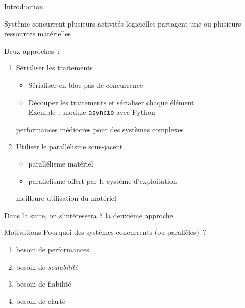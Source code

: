 \begin {frame} {Introduction}

    Système concurrent \implique plusieurs activités logicielles
    partagent une ou plusieurs ressources matérielles

    \vspace* {3mm}

    Deux approches~:

    \begin {enumerate}
	\item Sérialiser les traitements
	    \begin {itemize}
		\item Sérialiser en bloc \implique pas de
		    concurrence
		\item Découper les traitements et sérialiser chaque élément \\
		    Exemple~: module \texttt {asyncio} avec Python

	    \end {itemize}
	    \implique performances médiocres pour des systèmes complexes

	\item Utiliser le parallélisme sous-jacent
	    \begin {itemize}
		\item parallélisme matériel
		\item parallélisme offert par le système d'exploitation
	    \end {itemize}
	    \implique meilleure utilisation du matériel
    \end {enumerate}

    Dans la suite, on s'intéressera à la deuxième approche

\end {frame}



\begin {frame} {Motivations}
    Pourquoi des systèmes concurrents (ou parallèles)~?

    \begin {enumerate}
	\item besoin de performances
	\item besoin de \emph {scalabilité}
	\item besoin de fiabilité
	\item besoin de clarté
    \end {enumerate}
\end {frame}

